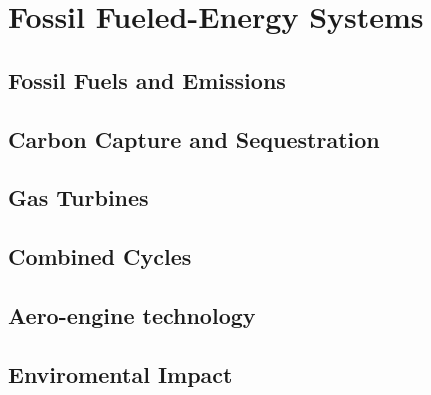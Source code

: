 \chapter{Fossil Fueled-Energy Systems}
\section{Fossil Fuels and Emissions}
\section{Carbon Capture and Sequestration}
\section{Gas Turbines}
\section{Combined Cycles}
\section{Aero-engine technology}
\section{Enviromental Impact}


